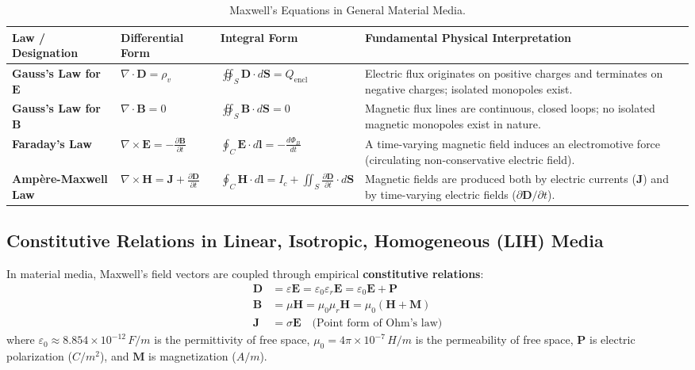 \begin{table}[htbp]
\centering
\small
\renewcommand{\arraystretch}{1.4}
\begin{tabularx}{\linewidth}{lllX}
\toprule
\textbf{Law / Designation} & \textbf{Differential Form} & \textbf{Integral Form} & \textbf{Fundamental Physical Interpretation} \\
\midrule
\textbf{Gauss's Law for $\mathbf{E}$} & $\nabla \cdot \mathbf{D} = \rho_v$ & $\oiint_S \mathbf{D} \cdot d\mathbf{S} = Q_{\text{encl}}$ & Electric flux originates on positive charges and terminates on negative charges; isolated monopoles exist. \\
\textbf{Gauss's Law for $\mathbf{B}$} & $\nabla \cdot \mathbf{B} = 0$ & $\oiint_S \mathbf{B} \cdot d\mathbf{S} = 0$ & Magnetic flux lines are continuous, closed loops; no isolated magnetic monopoles exist in nature. \\
\textbf{Faraday's Law} & $\nabla \times \mathbf{E} = -\frac{\partial \mathbf{B}}{\partial t}$ & $\oint_C \mathbf{E} \cdot d\mathbf{l} = -\frac{d\Phi_B}{dt}$ & A time-varying magnetic field induces an electromotive force (circulating non-conservative electric field). \\
\textbf{Ampère-Maxwell Law} & $\nabla \times \mathbf{H} = \mathbf{J} + \frac{\partial \mathbf{D}}{\partial t}$ & $\oint_C \mathbf{H} \cdot d\mathbf{l} = I_c + \iint_S \frac{\partial \mathbf{D}}{\partial t} \cdot d\mathbf{S}$ & Magnetic fields are produced both by electric currents ($\mathbf{J}$) and by time-varying electric fields ($\partial \mathbf{D}/\partial t$). \\
\bottomrule
\end{tabularx}
\caption{Maxwell's Equations in General Material Media.}
\label{tab:maxwell-master}
\end{table}

\subsection{Constitutive Relations in Linear, Isotropic, Homogeneous (LIH) Media}
In material media, Maxwell's field vectors are coupled through empirical \textbf{constitutive relations}:
\begin{align}
    \mathbf{D} &= \varepsilon \mathbf{E} = \varepsilon_0 \varepsilon_r \mathbf{E} = \varepsilon_0 \mathbf{E} + \mathbf{P} \\
    \mathbf{B} &= \mu \mathbf{H} = \mu_0 \mu_r \mathbf{H} = \mu_0(\mathbf{H} + \mathbf{M}) \\
    \mathbf{J} &= \sigma \mathbf{E} \quad \text{(Point form of Ohm's law)}
\end{align}
where $\varepsilon_0 \approx 8.854 \times 10^{-12}\,\si{F/m}$ is the permittivity of free space, $\mu_0 = 4\pi \times 10^{-7}\,\si{H/m}$ is the permeability of free space, $\mathbf{P}$ is electric polarization ($\si{C/m^2}$), and $\mathbf{M}$ is magnetization ($\si{A/m}$).


